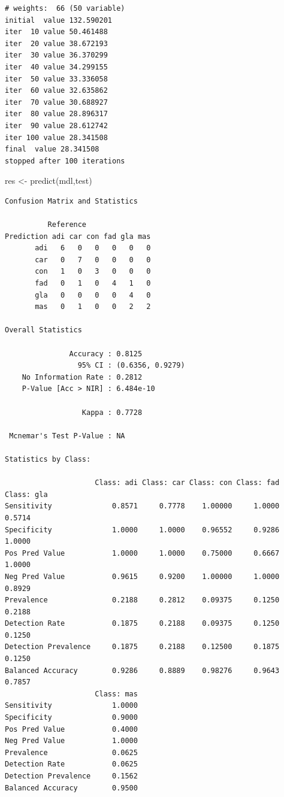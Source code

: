 \documentclass[
  letterpaper,
  DIV=11,
  numbers=noendperiod]{scrartcl}
\newenvironment{Shaded}{\begin{snugshade}}{\end{snugshade}}
\newcommand{\FunctionTok}[1]{\textcolor[rgb]{0.28,0.35,0.67}{#1}}
\newcommand{\NormalTok}[1]{\textcolor[rgb]{0.00,0.23,0.31}{#1}}
\newcommand{\OtherTok}[1]{\textcolor[rgb]{0.00,0.23,0.31}{#1}}
\newcommand{\SpecialCharTok}[1]{\textcolor[rgb]{0.37,0.37,0.37}{#1}}
\begin{document}
\begin{verbatim}
# weights:  66 (50 variable)
initial  value 132.590201 
iter  10 value 50.461488
iter  20 value 38.672193
iter  30 value 36.370299
iter  40 value 34.299155
iter  50 value 33.336058
iter  60 value 32.635862
iter  70 value 30.688927
iter  80 value 28.896317
iter  90 value 28.612742
iter 100 value 28.341508
final  value 28.341508 
stopped after 100 iterations
\end{verbatim}

\begin{Shaded}
\begin{Highlighting}[]
\NormalTok{res }\OtherTok{\textless{}{-}} \FunctionTok{predict}\NormalTok{(mdl,test)}
\end{Highlighting}
\end{Shaded}

\begin{Shaded}
\end{Shaded}

\begin{verbatim}
Confusion Matrix and Statistics

          Reference
Prediction adi car con fad gla mas
       adi   6   0   0   0   0   0
       car   0   7   0   0   0   0
       con   1   0   3   0   0   0
       fad   0   1   0   4   1   0
       gla   0   0   0   0   4   0
       mas   0   1   0   0   2   2

Overall Statistics
                                          
               Accuracy : 0.8125          
                 95% CI : (0.6356, 0.9279)
    No Information Rate : 0.2812          
    P-Value [Acc > NIR] : 6.484e-10       
                                          
                  Kappa : 0.7728          
                                          
 Mcnemar's Test P-Value : NA              

Statistics by Class:

                     Class: adi Class: car Class: con Class: fad Class: gla
Sensitivity              0.8571     0.7778    1.00000     1.0000     0.5714
Specificity              1.0000     1.0000    0.96552     0.9286     1.0000
Pos Pred Value           1.0000     1.0000    0.75000     0.6667     1.0000
Neg Pred Value           0.9615     0.9200    1.00000     1.0000     0.8929
Prevalence               0.2188     0.2812    0.09375     0.1250     0.2188
Detection Rate           0.1875     0.2188    0.09375     0.1250     0.1250
Detection Prevalence     0.1875     0.2188    0.12500     0.1875     0.1250
Balanced Accuracy        0.9286     0.8889    0.98276     0.9643     0.7857
                     Class: mas
Sensitivity              1.0000
Specificity              0.9000
Pos Pred Value           0.4000
Neg Pred Value           1.0000
Prevalence               0.0625
Detection Rate           0.0625
Detection Prevalence     0.1562
Balanced Accuracy        0.9500
\end{verbatim}
\end{document}
